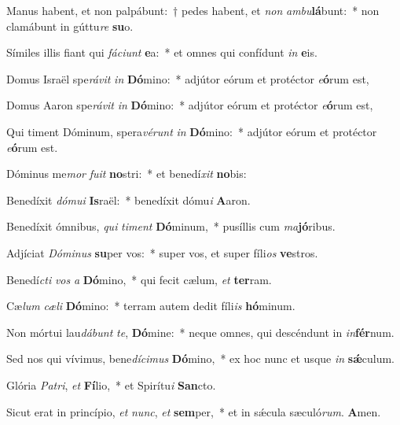 \item Manus habent, et non palpábunt:~† pedes habent, et \textit{non} \textit{am}\textit{bu}\textbf{lá}bunt:~* non clamábunt in gúttu\textit{re} \textbf{su}o.

\item Símiles illis fiant qui \textit{fá}\textit{ci}\textit{unt} \textbf{e}a:~* et omnes qui confídunt \textit{in} \textbf{e}is.

\item Domus Israël spe\textit{rá}\textit{vit} \textit{in} \textbf{Dó}mino:~* adjútor eórum et protéctor \textit{e}\textbf{ó}rum est,

\item Domus Aaron spe\textit{rá}\textit{vit} \textit{in} \textbf{Dó}mino:~* adjútor eórum et protéctor \textit{e}\textbf{ó}rum est,

\item Qui timent Dóminum, spera\textit{vé}\textit{runt} \textit{in} \textbf{Dó}mino:~* adjútor eórum et protéctor \textit{e}\textbf{ó}rum est.

\item Dóminus me\textit{mor} \textit{fu}\textit{it} \textbf{no}stri:~* et benedí\textit{xit} \textbf{no}bis:

\item Benedíxit \textit{dó}\textit{mu}\textit{i} \textbf{Is}raël:~* benedíxit dómu\textit{i} \textbf{A}aron.

\item Benedíxit ómnibus, \textit{qui} \textit{ti}\textit{ment} \textbf{Dó}minum,~* pusíllis cum \textit{ma}\textbf{jó}ribus.

\item Adjíciat \textit{Dó}\textit{mi}\textit{nus} \textbf{su}per vos:~* super vos, et super fíli\textit{os} \textbf{ve}stros.

\item Benedí\textit{cti} \textit{vos} \textit{a} \textbf{Dó}mino,~* qui fecit cælum, \textit{et} \textbf{ter}ram.

\item Cæ\textit{lum} \textit{cæ}\textit{li} \textbf{Dó}mino:~* terram autem dedit fíli\textit{is} \textbf{hó}minum.

\item Non mórtui lau\textit{dá}\textit{bunt} \textit{te}, \textbf{Dó}mine:~* neque omnes, qui descéndunt in \textit{in}\textbf{fér}num.

\item Sed nos qui vívimus, bene\textit{dí}\textit{ci}\textit{mus} \textbf{Dó}mino,~* ex hoc nunc et usque \textit{in} \textbf{sǽ}culum.

\item Glória \textit{Pa}\textit{tri}, \textit{et} \textbf{Fí}lio,~* et Spirítu\textit{i} \textbf{San}cto.

\item Sicut erat in princípio, \textit{et} \textit{nunc}, \textit{et} \textbf{sem}per,~* et in sǽcula sæculó\textit{rum}. \textbf{A}men.